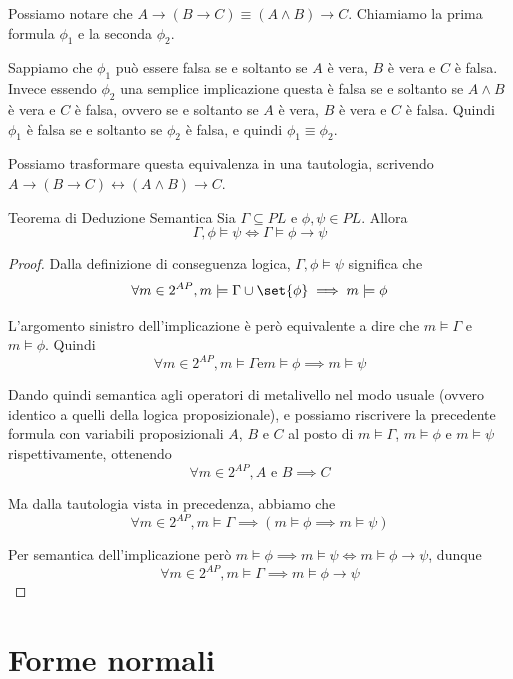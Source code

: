 Possiamo notare che \(A \to (B\to C)\equiv (A\land B)\to C\). Chiamiamo la prima formula \(\phi_1\) e la seconda \(\phi_2\).

Sappiamo che \(\phi_1\) può essere falsa se e soltanto se \(A\) è vera, \(B\) è vera e \(C\) è falsa. 
Invece essendo \(\phi_2\) una semplice implicazione questa è falsa se e soltanto se \(A\land B\) è vera e \(C\) è falsa, ovvero se e soltanto se \(A\) è vera, \(B\) è vera e \(C\) è falsa. Quindi \(\phi_1\) è falsa se e soltanto se \(\phi_2\) è falsa, e quindi \(\phi_1\equiv\phi_2\).

Possiamo trasformare questa equivalenza in una tautologia, scrivendo \(A \to (B\to C) \leftrightarrow (A\land B)\to C\).

\begin{theorem}[namedlabel={thm:semantic_deduction}{Teorema di Deduzione Semantica}]{Teorema di Deduzione Semantica}
  Sia \(\Gamma \subseteq PL\) e \(\phi,\psi \in PL\). Allora
  \[\Gamma,\phi \models \psi \iff \Gamma \models \phi\to\psi\]
\end{theorem}

\begin{proof}
  Dalla definizione di conseguenza logica, \(\Gamma,\phi \models \psi\) significa che
  \[\forall m \in 2^{AP}, m\models \Gamma \cup \set{\phi} \implies m\models \phi\]

  L'argomento sinistro dell'implicazione è però equivalente a dire che \(m\models \Gamma\) e \(m\models \phi\). Quindi
  \[\forall m \in 2^{AP}, m\models \Gamma \text{e} m\models \phi \implies m\models \psi\]

  Dando quindi semantica agli operatori di metalivello nel modo usuale (ovvero identico a quelli della logica proposizionale), e possiamo riscrivere la precedente formula con variabili proposizionali \(A\), \(B\) e \(C\) al posto di \(m\models \Gamma\), \(m\models \phi\) e \(m\models \psi\) rispettivamente, ottenendo
  \[\forall m \in 2^{AP}, A\text{ e }B \implies C\]

  Ma dalla tautologia vista in precedenza, abbiamo che
  \[\forall m \in 2^{AP}, m\models \Gamma \implies (m\models \phi \implies m\models \psi)\]

  Per semantica dell'implicazione però \(m\models \phi \implies m\models \psi \iff m\models \phi \to \psi\), dunque
  \[\forall m \in 2^{AP}, m\models \Gamma \implies m\models \phi\to\psi\]
\end{proof}

\section{Forme normali}

